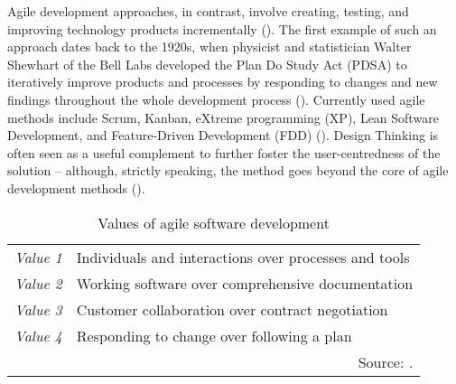 Agile development approaches, in contrast, involve creating, testing, and improving technology products incrementally (\cite{Mergel2016}). The first example of such an approach dates back to the 1920s, when physicist and statistician Walter Shewhart of the Bell Labs developed the Plan Do Study Act (PDSA) to iteratively improve products and processes by responding to changes and new findings throughout the whole development process (\cite{Goldman1994}). Currently used agile methods include Scrum, Kanban, eXtreme programming (XP), Lean Software Development, and Feature-Driven Development (FDD) (\cite{Dingsoyr2012, Rigby2016a}). Design Thinking is often seen as a useful complement to further foster the user-centredness of the solution – although, strictly speaking, the method goes beyond the core of agile development methods (\cite{DaSilva2011, AustralianDigitalTransformationAgency2019}).

\begin{table}[ht!]
	\centering
	\begin{spacing}{.8}
	\caption{Values of agile software development}\label{tab: Values of agile software development}
	\renewcommand{\arraystretch}{1.4}
	\begin{tabular}{ p{1.5cm} p{9.5cm} }
		\hline
		\textit{Value 1} & Individuals and interactions over processes and tools\\
		\textit{Value 2} & Working software over comprehensive documentation\\
		\textit{Value 3} & Customer collaboration over contract negotiation\\
		\textit{Value 4} & Responding to change over following a plan\\
		\hline
		\multicolumn{2}{r}{Source: \cite{AgileManifesto2001}.}	
	\end{tabular}
    \end{spacing}
\end{table}

